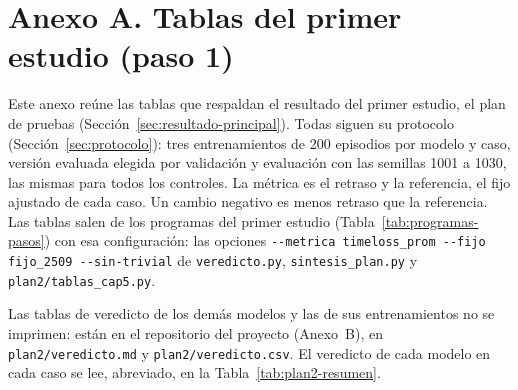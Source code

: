 
\section*{Anexo A. Tablas del primer estudio (paso 1)}
{}
\setcounter{table}{0}
\renewcommand{\thetable}{A.\arabic{table}}
\renewcommand{\theHtable}{A.\arabic{table}}

Este anexo reúne las tablas que respaldan el resultado del primer
estudio, el plan de pruebas (Sección~\ref{sec:resultado-principal}).
Todas siguen su protocolo (Sección~\ref{sec:protocolo}): tres
entrenamientos de 200 episodios por modelo y caso, versión evaluada
elegida por validación y evaluación con las semillas 1001 a 1030, las
mismas para todos los controles. La métrica es el retraso y la
referencia, el fijo ajustado de cada caso. Un cambio negativo es menos
retraso que la referencia. Las tablas salen de los programas del primer
estudio (Tabla~\ref{tab:programas-pasos}) con esa configuración: las
opciones \texttt{-{}-metrica timeloss\_prom -{}-fijo fijo\_2509
-{}-sin-trivial} de \texttt{veredicto.py}, \texttt{sintesis\_plan.py} y
\texttt{plan2/\allowbreak tablas\_cap5.py}.

Las tablas de veredicto de los demás modelos y las de sus
entrenamientos no se imprimen: están en el repositorio del proyecto
(Anexo~B), en \texttt{plan2/\allowbreak veredicto.md} y
\texttt{plan2/\allowbreak veredicto.csv}. El veredicto de cada modelo
en cada caso se lee, abreviado, en la Tabla~\ref{tab:plan2-resumen}.

